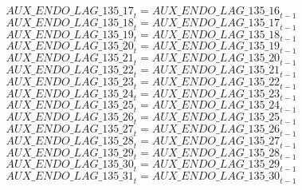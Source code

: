 \begin{dmath}
{AUX\_ENDO\_LAG\_135\_17}_{t}={AUX\_ENDO\_LAG\_135\_16}_{t-1}
\end{dmath}
\begin{dmath}
{AUX\_ENDO\_LAG\_135\_18}_{t}={AUX\_ENDO\_LAG\_135\_17}_{t-1}
\end{dmath}
\begin{dmath}
{AUX\_ENDO\_LAG\_135\_19}_{t}={AUX\_ENDO\_LAG\_135\_18}_{t-1}
\end{dmath}
\begin{dmath}
{AUX\_ENDO\_LAG\_135\_20}_{t}={AUX\_ENDO\_LAG\_135\_19}_{t-1}
\end{dmath}
\begin{dmath}
{AUX\_ENDO\_LAG\_135\_21}_{t}={AUX\_ENDO\_LAG\_135\_20}_{t-1}
\end{dmath}
\begin{dmath}
{AUX\_ENDO\_LAG\_135\_22}_{t}={AUX\_ENDO\_LAG\_135\_21}_{t-1}
\end{dmath}
\begin{dmath}
{AUX\_ENDO\_LAG\_135\_23}_{t}={AUX\_ENDO\_LAG\_135\_22}_{t-1}
\end{dmath}
\begin{dmath}
{AUX\_ENDO\_LAG\_135\_24}_{t}={AUX\_ENDO\_LAG\_135\_23}_{t-1}
\end{dmath}
\begin{dmath}
{AUX\_ENDO\_LAG\_135\_25}_{t}={AUX\_ENDO\_LAG\_135\_24}_{t-1}
\end{dmath}
\begin{dmath}
{AUX\_ENDO\_LAG\_135\_26}_{t}={AUX\_ENDO\_LAG\_135\_25}_{t-1}
\end{dmath}
\begin{dmath}
{AUX\_ENDO\_LAG\_135\_27}_{t}={AUX\_ENDO\_LAG\_135\_26}_{t-1}
\end{dmath}
\begin{dmath}
{AUX\_ENDO\_LAG\_135\_28}_{t}={AUX\_ENDO\_LAG\_135\_27}_{t-1}
\end{dmath}
\begin{dmath}
{AUX\_ENDO\_LAG\_135\_29}_{t}={AUX\_ENDO\_LAG\_135\_28}_{t-1}
\end{dmath}
\begin{dmath}
{AUX\_ENDO\_LAG\_135\_30}_{t}={AUX\_ENDO\_LAG\_135\_29}_{t-1}
\end{dmath}
\begin{dmath}
{AUX\_ENDO\_LAG\_135\_31}_{t}={AUX\_ENDO\_LAG\_135\_30}_{t-1}
\end{dmath}

